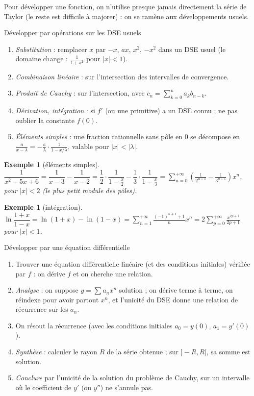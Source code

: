 \documentclass[a4paper,11pt]{article}
\numberwithin{equation}{section}
\numberwithin{figure}{section}
\numberwithin{table}{section}
\theoremstyle{enonce}
\theoremstyle{exemple}
\newtheorem{exemple}[definition]{Exemple}
\theoremstyle{remarque}
\begin{document}
Pour développer une fonction, on n'utilise presque jamais directement la série de Taylor (le reste est difficile à majorer) :
on se ramène aux développements usuels.

\begin{methode}{Développer par opérations sur les DSE usuels}\label{m:operations}
\begin{enumerate}
\item \emph{Substitution} : remplacer $x$ par $-x$, $ax$, $x^2$, $-x^2$ dans un DSE usuel (le domaine change : $\frac1{1+x^2}$ pour $|x|<1$).
\item \emph{Combinaison linéaire} : sur l'intersection des intervalles de convergence.
\item \emph{Produit de Cauchy} : sur l'intersection, avec $c_n=\sum_{k=0}^na_kb_{n-k}$.
\item \emph{Dérivation, intégration} : si $f'$ (ou une primitive) a un DSE connu ; ne pas oublier la constante $f(0)$.
\item \emph{Éléments simples} : une fraction rationnelle sans pôle en $0$ se décompose en $\frac a{x-\lambda}=-\frac a\lambda\cdot\frac1{1-x/\lambda}$, valable pour $|x|<|\lambda|$.
\end{enumerate}
\end{methode}

\begin{exemple}[éléments simples]
$\dfrac1{x^2-5x+6}=\dfrac1{x-3}-\dfrac1{x-2}=\dfrac12\cdot\dfrac1{1-\frac x2}-\dfrac13\cdot\dfrac1{1-\frac x3}
=\sum_{n=0}^{+\infty}\left(\frac1{2^{n+1}}-\frac1{3^{n+1}}\right)x^n$, pour $|x|<2$ (le plus petit module des pôles).
\end{exemple}

\begin{exemple}[intégration]
$\ln\dfrac{1+x}{1-x}=\ln(1+x)-\ln(1-x)=\sum_{n=1}^{+\infty}\frac{(-1)^{n+1}+1}nx^n=2\sum_{p=0}^{+\infty}\frac{x^{2p+1}}{2p+1}$ pour $|x|<1$.
\end{exemple}

\begin{methode}{Développer par une équation différentielle}\label{m:ed}
\begin{enumerate}
\item Trouver une équation différentielle linéaire (et des conditions initiales) vérifiée par $f$ : on dérive $f$ et on cherche
une relation.
\item \emph{Analyse} : on suppose $y=\sum a_nx^n$ solution ; on dérive terme à terme, on réindexe pour avoir partout $x^n$, et
l'unicité du DSE donne une relation de récurrence sur les $a_n$.
\item On résout la récurrence (avec les conditions initiales $a_0=y(0)$, $a_1=y'(0)$).
\item \emph{Synthèse} : calculer le rayon $R$ de la série obtenue ; sur $]-R,R[$, sa somme est solution.
\item \emph{Conclure} par l'unicité de la solution du problème de Cauchy, sur un intervalle où le coefficient de $y'$ (ou $y''$) ne
s'annule pas.
\end{enumerate}
\end{methode}
\end{document}
